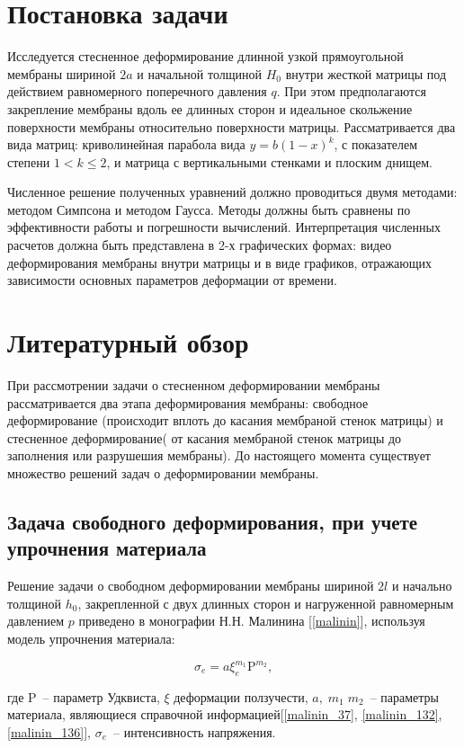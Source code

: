 \section{Постановка задачи}
Исследуется стесненное деформирование длинной узкой прямоугольной мембраны шириной $2a$ и начальной толщиной $H_0$ внутри жесткой матрицы под 
действием равномерного поперечного давления $q$. При этом предполагаются закрепление мембраны вдоль ее длинных сторон и идеальное скольжение 
поверхности мембраны относительно поверхности матрицы.
Рассматривается два вида матриц: криволинейная парабола вида $y = b(1-x)^k$, с показателем степени $1<k \leqslant 2$, и матрица с вертикальными 
стенками и плоским днищем.

Численное решение полученных уравнений должно проводиться двумя методами: методом Симпсона и методом Гаусса. Методы должны быть 
сравнены по эффективности работы и погрешности вычислений.
Интерпретация численных расчетов должна быть представлена в 2-х графических формах: видео деформирования мембраны внутри матрицы и 
в виде графиков, отражающих зависимости основных параметров деформации от времени.

\section{Литературный обзор}

При рассмотрении задачи о стесненном деформировании мембраны рассматривается 
два этапа деформирования мембраны: свободное деформирование (происходит вплоть до касания мембраной стенок матрицы) и стесненное деформирование( от касания мембраной стенок матрицы до заполнения или разрушешия мембраны). До настоящего момента существует множество решений задач о деформировании мембраны.

\subsection{Задача свободного деформирования, при учете упрочнения материала}
Решение задачи о свободном деформировании мембраны шириной $2l$ и начально толщиной $h_0$, закрепленной с двух длинных сторон и нагруженной равномерным давлением $p$ приведено в монографии Н.Н. Малинина [\ref{malinin}], используя модель упрочнения материала:

\begin{equation}
	\sigma_e = a\xi_e^{m_1}\text{P}^{m_2},
\end{equation}

где P~-- параметр Удквиста, $\xi$ деформации ползучести, $a, \; m_1\; m_2$~-- параметры материала, 
являющиеся справочной информацией[\ref{malinin_37}, \ref{malinin_132}, \ref{malinin_136}], $\sigma_e$~--
интенсивность напряжения. 

